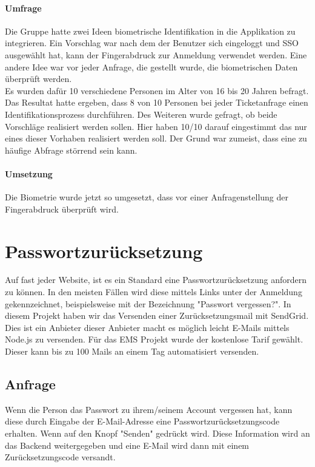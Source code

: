\paragraph{Umfrage} Die Gruppe hatte zwei Ideen biometrische Identifikation in die Applikation zu integrieren. Ein Vorschlag war nach dem der Benutzer sich eingeloggt und SSO ausgewählt hat, kann der Fingerabdruck zur Anmeldung verwendet werden.
Eine andere Idee war vor jeder Anfrage, die gestellt wurde, die biometrischen Daten überprüft werden.
\\
Es wurden dafür 10 verschiedene Personen im Alter von 16 bis 20 Jahren befragt. Das Resultat hatte ergeben, dass 8 von 10 Personen bei jeder Ticketanfrage einen Identifikationsprozess durchführen.
Des Weiteren wurde gefragt, ob beide Vorschläge realisiert werden sollen. Hier haben 10/10 darauf eingestimmt das nur eines dieser Vorhaben realisiert werden soll. Der Grund war zumeist, dass eine zu häufige Abfrage störrend sein kann.

\paragraph{Umsetzung} Die Biometrie wurde jetzt so umgesetzt, dass vor einer Anfragenstellung der Fingerabdruck überprüft wird.

\section{Passwortzurücksetzung}
Auf fast jeder Website, ist es ein Standard eine Passwortzurücksetzung anfordern zu können. In den meisten Fällen wird diese mittels Links unter der Anmeldung gekennzeichnet, beispielsweise mit der Bezeichnung "Passwort vergessen?".
In diesem Projekt haben wir das Versenden einer Zurücksetzungsmail mit SendGrid. Dies ist ein Anbieter dieser Anbieter macht es möglich leicht E-Mails mittels Node.js zu versenden.
Für das EMS Projekt wurde der kostenlose Tarif gewählt. Dieser kann bis zu 100 Mails an einem Tag automatisiert versenden.

\subsection{Anfrage}
Wenn die Person das Passwort zu ihrem/seinem Account vergessen hat, kann diese durch Eingabe der E-Mail-Adresse eine Passwortzurücksetzungscode erhalten. Wenn auf den Knopf "Senden" gedrückt wird.
Diese Information wird an das Backend weitergegeben und eine E-Mail wird dann mit einem Zurücksetzungscode versandt. 

